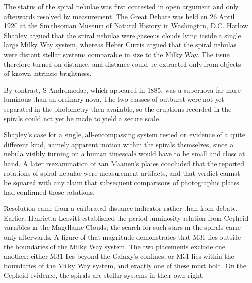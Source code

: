 The status of the spiral nebulae was first contested in open argument and only afterwards resolved by measurement. The Great Debate was held on 26 April 1920 at the Smithsonian Museum of Natural History in Washington, D.C. Harlow Shapley argued that the spiral nebulae were gaseous clouds lying inside a single large Milky Way system, whereas Heber Curtis argued that the spiral nebulae were distant stellar systems comparable in size to the Milky Way. The issue therefore turned on distance, and distance could be extracted only from objects of known intrinsic brightness.

 By contrast, S Andromedae, which appeared in 1885, was a supernova far more luminous than an ordinary nova. The two classes of outburst were not yet separated in the photometry then available, so the eruptions recorded in the spirals could not yet be made to yield a secure scale.

Shapley's case for a single, all-encompassing system rested on evidence of a quite different kind, namely apparent motion within the spirals themselves, since a nebula visibly turning on a human timescale would have to be small and close at hand.  A later reexamination of van Maanen's plates concluded that the reported rotations of spiral nebulae were measurement artifacts, and that verdict cannot be squared with any claim that subsequent comparisons of photographic plates had confirmed those rotations.

Resolution came from a calibrated distance indicator rather than from debate. Earlier, Henrietta Leavitt established the period-luminosity relation from Cepheid variables in the Magellanic Clouds; the search for such stars in the spirals came only afterwards.  A figure of that magnitude demonstrates that M31 lies outside the boundaries of the Milky Way system. The two placements exclude one another: either M31 lies beyond the Galaxy's confines, or M31 lies within the boundaries of the Milky Way system, and exactly one of these must hold. On the Cepheid evidence, the spirals are stellar systems in their own right.
